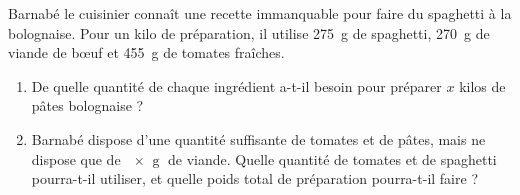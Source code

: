 
\begin{exercice}\label{exo2smath-0111}

    Barnabé le cuisinier connaît une recette immanquable pour faire du spaghetti à la bolognaise. Pour un kilo de préparation, il utilise \SI{275}{\gram} de spaghetti, \SI{270}{\gram} de viande de bœuf et \SI{455}{\gram} de tomates fraîches.

    \begin{enumerate}
        \item
            De quelle quantité de chaque ingrédient a-t-il besoin pour préparer \( x\) kilos de pâtes bolognaise ?
        \item
            Barnabé dispose d'une quantité suffisante de tomates et de pâtes, mais ne dispose que de \( \SI{x}{\gram}\) de viande. Quelle quantité de tomates et de spaghetti pourra-t-il utiliser, et quelle poids total de préparation pourra-t-il faire ?
    \end{enumerate}

\end{exercice}
